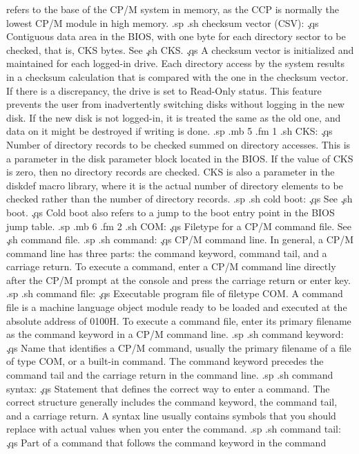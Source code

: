 refers to the base of the CP/M system in memory, as the CCP is 
normally the lowest CP/M module in high memory.
.sp
.sh
checksum vector (CSV):  \c
.qs
Contiguous data area in the BIOS, with one byte for each 
directory sector to be checked, that is, CKS bytes.  See \c
.sh
CKS.  \c
.qs
A checksum vector is initialized and maintained for each logged-in
drive.  Each directory access by the system results in a checksum 
calculation that is compared with the one in the checksum vector.  
If there is a discrepancy, the drive is set to Read-Only status.  
This feature prevents the user from inadvertently switching disks 
without logging in the new disk.  If the new disk is not logged-in,
it is treated the same as the old one, and data on it might be 
destroyed if writing is done.
.sp
.mb 5
.fm 1
.sh
CKS:  \c
.qs
Number of directory records to be checked summed on directory 
accesses.  This is a parameter in the disk parameter block 
located in the BIOS.  If the value of CKS is zero, then no 
directory records are checked.  CKS is also a parameter in the 
diskdef macro library, where it is the actual number of directory 
elements to be checked rather than the number of directory 
records.
.sp
.sh
cold boot:  \c
.qs
See \c
.sh
boot.  \c
.qs
Cold boot also refers to a jump to the boot entry point in the 
BIOS jump table.
.sp
.mb 6
.fm 2
.sh
COM:  \c
.qs
Filetype for a CP/M command file.  See \c
.sh
command file.
.sp
.sh
command:  \c
.qs
CP/M command line.  In general, a CP/M command line has three 
parts:  the command keyword, command tail, and a carriage return.  
To execute a command, enter a CP/M command line directly after 
the CP/M prompt at the console and press the carriage return or 
enter key.
.sp
.sh
command file:  \c
.qs
Executable program file of filetype COM.  A command file is a 
machine language object module ready to be loaded and executed at 
the absolute address of 0100H.  To execute a command file, enter 
its primary filename as the command keyword in a CP/M command 
line.
.sp
.sh
command keyword:  \c
.qs
Name that identifies a CP/M command, usually the primary filename 
of a file of type COM, or a built-in command.  The command 
keyword precedes the command tail and the carriage return in the 
command line.
.sp
.sh
command syntax:  \c
.qs
Statement that defines the correct way to enter a command.  The 
correct structure generally includes the command keyword, the 
command tail, and a carriage return.  A syntax line usually 
contains symbols that you should replace with actual values when 
you enter the command.
.sp
.sh
command tail:  \c
.qs
Part of a command that follows the command keyword in the command 
